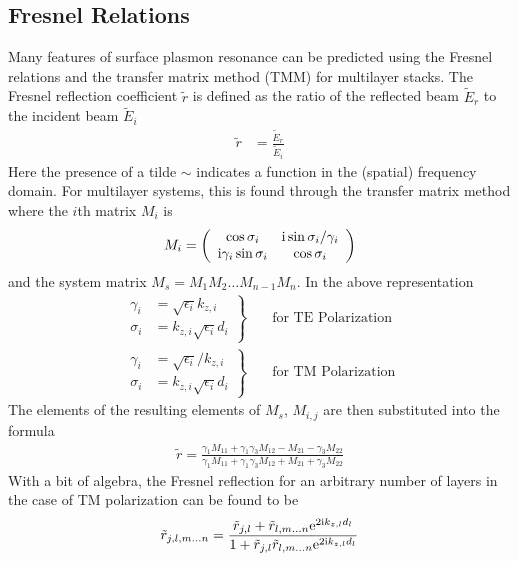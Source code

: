 \documentclass[a4paper,titlepage,onecolumn]{report}
\begin{document}
\subsection{Fresnel Relations}
Many features of surface plasmon resonance can be predicted using the
Fresnel relations and the transfer matrix method (TMM) for multilayer
stacks.
The Fresnel reflection coefficient $\tilde{r}$ is defined as the ratio of the
reflected beam $\tilde{E}_r$ to the incident beam
$\tilde{E}_i$
\begin{align}
\tilde{r} &= \frac{\tilde{E}_r}{\tilde{E}_i}
\end{align}
Here the presence of a tilde $\sim$ indicates a function in the (spatial)
frequency domain.  For multilayer systems, this is found through
the transfer matrix method where the $i$th matrix $M_i$ is
\begin{align}
M_i = \left(\begin{array}{cc}
\cos \sigma_i & {\mathrm{i}} \sin \sigma_i / \gamma_i\\
{\mathrm{i}} \gamma_i \sin \sigma_i & \cos \sigma_i
\end{array}\right)
\label{eqn:tmm}
\end{align}
and the system matrix $M_s = M_1 M_2 \ldots M_{n-1} M_n$.  In the above
representation
\begin{align}
\left.\begin{aligned}
\gamma_i &= \sqrt{\epsilon_i} k_{z,i}\\
\sigma_i &= k_{z,i} \sqrt{\epsilon_i} d_i
\end{aligned}
\right\}& \quad \text{for TE Polarization}\\
\left.\begin{aligned}
\gamma_i &= \sqrt{\epsilon_i}/k_{z,i}\\
\sigma_i &= k_{z,i} \sqrt{\epsilon_i} d_i
\end{aligned}
\right\}& \quad \text{for TM Polarization}
\end{align}
The elements of the resulting elements of $M_s$, $M_{i,j}$ are then
substituted into the formula
\begin{align}
\tilde{r}=
\frac{\gamma_1 M_{11}+\gamma_1 \gamma_3 M_{12} - M_{21} - \gamma_3 M_{22}}
{\gamma_1 M_{11}+\gamma_1 \gamma_3 M_{12} + M_{21} + \gamma_3 M_{22}}
\end{align}
With a bit of algebra, the Fresnel reflection for an arbitrary number of
layers in the case of TM polarization can be found to be
\begin{align}
\tilde{r}_{j,l,m \ldots n} = 
\frac{\tilde{r}_{j,l} + \tilde{r}_{l,m \ldots n} {\mathrm{e}}^{2 {\mathrm{i}} k_{z,l} d_l}}
{1+\tilde{r}_{j,l} \tilde{r}_{l,m \ldots n} {\mathrm{e}}^{2 {\mathrm{i}} k_{z,l} d_l}}
\label{eqn:bertnlayer}
\end{align}
\end{document}
